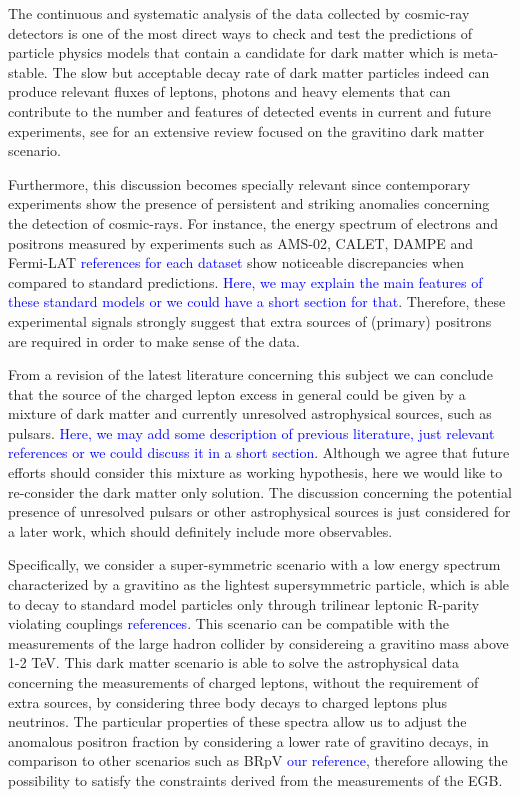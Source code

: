 \documentclass[a4paper,11pt]{article}
\newcommand*{\blue}{\textcolor{blue}}
\begin{document}
The continuous and systematic analysis of the data collected by cosmic-ray detectors is one of the most direct ways to check and test the predictions of particle physics models that contain a candidate for dark matter which is meta-stable. The slow but acceptable decay rate of dark matter particles indeed can produce relevant fluxes of leptons, photons and heavy elements that can contribute to the number and features of detected events in current and future experiments, see \cite{Grefe:2011dp} for an extensive review focused on the gravitino dark matter scenario. 

Furthermore, this discussion becomes specially relevant since contemporary experiments show the presence of persistent and striking anomalies concerning the detection of cosmic-rays. For instance, the energy spectrum of electrons and positrons measured by experiments such as AMS-02, CALET, DAMPE and Fermi-LAT \blue{references for each dataset} show noticeable discrepancies when compared to standard predictions. \blue{Here, we may explain the main features of these standard models or we could have a short section for that}. Therefore, these experimental signals strongly suggest that extra sources of (primary) positrons are required in order to make sense of the data. 

From a revision of the latest literature concerning this subject we can conclude that the source of the charged lepton excess in general could be given by a mixture of dark matter and currently unresolved astrophysical sources, such as pulsars. \blue{Here, we may add some description of previous literature, just relevant references or we could discuss it in a short section}. Although we agree that future efforts should consider this mixture as working hypothesis, here we would like to re-consider the dark matter only solution. The discussion concerning the potential presence of unresolved pulsars or other astrophysical sources is just considered for a later work, which should definitely include more observables.   

Specifically, we consider a super-symmetric scenario with a low energy spectrum characterized by a gravitino as the lightest supersymmetric particle, which is able to decay to standard model particles only through trilinear leptonic R-parity violating couplings \blue{references}. This scenario can be compatible with the measurements of the large hadron collider by considereing a gravitino mass above 1-2 TeV. This dark matter scenario is able to solve the astrophysical data concerning the measurements of charged leptons, without the requirement of extra sources, by considering three body decays to charged leptons plus neutrinos. The particular properties of these spectra allow us to adjust the anomalous positron fraction by considering a lower rate of gravitino decays, in comparison to other scenarios such as BRpV \blue{our reference}, therefore allowing the possibility to satisfy the constraints derived from the measurements of the EGB.
\end{document}
